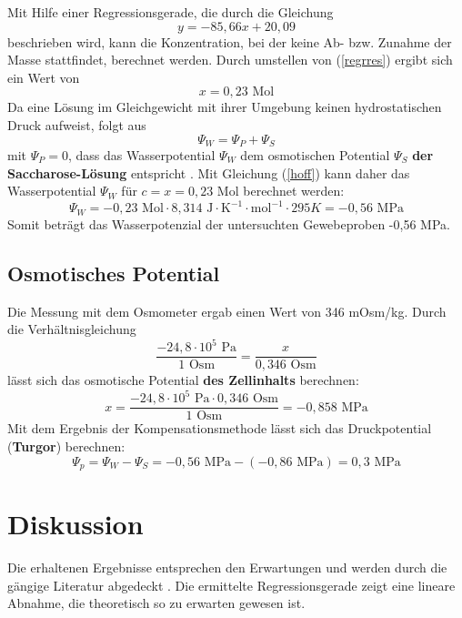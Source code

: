\documentclass[11pt,a4paper,DIV=10,]{scrartcl}
\begin{document}
\noindent
Mit Hilfe einer Regressionsgerade, die durch die Gleichung
\begin{equation}
y= -85,66x+20,09 \label{regrres}
\end{equation}
beschrieben wird, kann die Konzentration, bei der keine Ab- bzw. Zunahme der Masse stattfindet, berechnet werden. Durch umstellen von (\ref{regrres}) ergibt sich ein Wert von
\begin{equation}
x=0,23 \textrm{~Mol}
\end{equation}
Da eine Lösung im Gleichgewicht mit ihrer Umgebung keinen hydrostatischen Druck aufweist, folgt aus
\begin{equation}
\Psi_W=\Psi_P+\Psi_S
\end{equation}
mit $\Psi_P=0$, dass das Wasserpotential $\Psi_W$ dem osmotischen Potential $\Psi_S$ \textbf{der Saccharose-Lösung} entspricht \citep[vgl.][S. 261]{strasburger_lehrbuch_2012}.
Mit Gleichung (\ref{hoff})
kann daher das Wasserpotential $\Psi_W$ für $c=x=0,23 \textrm{~Mol}$ berechnet werden:
\begin{equation}
\Psi_W=-0,23 \textrm{~Mol} \cdot 8,314 \textrm{~J}\cdot\textrm{K}^{-1}\cdot \textrm{mol}^{-1}\cdot 295 K=-0,56 \textrm{~MPa}
 \end{equation}
Somit beträgt das Wasserpotenzial der untersuchten Gewebeproben -0,56 MPa.
\subsection*{Osmotisches Potential}
Die Messung mit dem Osmometer ergab einen Wert von 346 mOsm/kg. Durch die Verhältnisgleichung
\begin{equation}
\dfrac{-24,8 \cdot 10^5 \textrm{~Pa}}{1 \textrm{~Osm} } = \dfrac{x}{0,346 \textrm{~Osm}}
\end{equation}
lässt sich das osmotische Potential \textbf{des Zellinhalts} berechnen:
\begin{equation}
x = \dfrac{-24,8 \cdot 10^5 \textrm{~Pa} \cdot 0,346 \textrm{~Osm}}{1 \textrm{~Osm} } = -0,858 \textrm{~MPa}
\end{equation}
Mit dem Ergebnis der Kompensationsmethode lässt sich das Druckpotential (\textbf{Turgor}) berechnen:
\begin{equation}
\Psi_p=\Psi_W-\Psi_S=-0,56 \textrm{~MPa} - (-0,86 \textrm{~MPa})= 0,3 \textrm{~MPa}
\end{equation}
%
\section*{Diskussion}
Die erhaltenen Ergebnisse entsprechen den Erwartungen und werden durch die gängige Literatur abgedeckt \citep[vgl.][S. 54]{schopfer_pflanzenphysiologie_2010}. Die ermittelte Regressionsgerade zeigt eine lineare Abnahme, die theoretisch so zu erwarten gewesen ist. 
\end{document}

